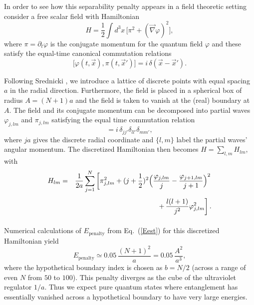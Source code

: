 \documentclass[twocolumn,aps,showpacs,prl]{revtex4}
\begin{document}
In order to see how this separability penalty appears in a field
theoretic setting consider a free scalar field with Hamiltonian
\begin{equation}
H=\frac{1}{2}\int d^3 x\,
\bigl[\pi^2+(\vec \nabla \varphi)^2\bigr],
\end{equation}
where $\pi=\partial_t \varphi$ is the conjugate momentum for the quantum
field $\varphi$ and these satisfy the equal-time canonical commutation
relations
\begin{equation}
\bigl[\varphi(t,\vec x),\pi(t,\vec x')\bigr]=i\, \delta(\vec x-\vec x').
\end{equation}

Following Srednicki \cite{Srednickiapp}, we introduce a lattice of discrete
points with equal spacing $a$ in the radial direction. Furthermore, the
field is placed in a spherical box of radius $A=(N+1)a$ and the field
is taken to vanish at the (real) boundary at $A$. The field and its
conjugate momentum can be decomposed into partial waves $\varphi_{j,lm}$
and $\pi_{j,lm}$ satisfying the equal time commutation relation
\begin{equation}
[\varphi_{j,lm}, \pi_{j',l'm'}]=i\,\delta_{jj'} \delta_{ll'} \delta_{mm'},
\end{equation}
where $j a$ gives the discrete radial coordinate and $\{l,m\}$
label the partial waves' angular momentum. The discretized
Hamiltonian then becomes $H=\sum_{l,m} H_{lm}$, with \cite{Srednickiapp}
\begin{eqnarray}
H_{lm}&=&\frac{1}{2a}\sum_{j=1}^N\left[
\pi_{j,lm}^2 +(j+\frac{1}{2})^2\Bigl(\frac{\varphi_{j,lm}}{j}
-\frac{\varphi_{j+1,lm}}{j+1}\Bigr)^2 \right.\nonumber\\
&&\phantom{\frac{1}{2a}\sum_{j=1}^N~}\left.
+\,\frac{l(l+1)}{j^2}\varphi_{j,lm}^2\right].
\label{Hfield}
\end{eqnarray}

Numerical calculations of $E_{\text{penalty}}$ from Eq.~(\ref{Eest}) for
this discretized Hamiltonian yield
\begin{equation}
E_{\text{penalty}}\simeq 0.05\, \frac{(N+1)^2}{a}=
0.05\, \frac{A^2}{a^3},
\end{equation}
where the hypothetical boundary index is chosen as $b=N/2$ (across a
range of even $N$ from $50$ to $100$). This penalty diverges as the
cube of the ultraviolet regulator $1/a$. Thus we expect pure quantum
states where entanglement has essentially vanished across a hypothetical
boundary to have very large energies.
\end{document}
